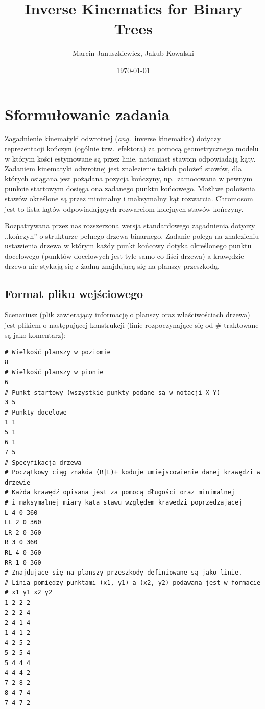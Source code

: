 \documentclass[11pt, leqno]{article}
\title{Inverse Kinematics for Binary Trees}
\date{\today}
\author{Marcin Januszkiewicz, Jakub Kowalski}
\begin{document}
\maketitle
\vspace{17em}
\tableofcontents
\newpage

\section{Sformułowanie zadania}
Zagadnienie kinematyki odwrotnej (\textit{ang.}\ inverse kinematics) dotyczy reprezentacji kończyn (ogólnie tzw.\ efektora) za pomocą geometrycznego modelu w którym kości estymowane są przez linie, natomiast stawom odpowiadają kąty. Zadaniem kinematyki odwrotnej jest znalezienie takich położeń stawów, dla których osiągana jest pożądana pozycja kończyny, np.\ zamocowana w pewnym punkcie startowym dosięga ona zadanego punktu końcowego. Możliwe położenia stawów określone są przez minimalny i maksymalny kąt rozwarcia. Chromosom jest to lista kątów odpowiadających rozwarciom kolejnych stawów kończyny.

Rozpatrywana przez nas rozszerzona wersja standardowego zagadnienia dotyczy ,,kończyn'' o strukturze pełnego drzewa binarnego. Zadanie polega na znalezieniu ustawienia drzewa w którym każdy punkt końcowy dotyka określonego punktu docelowego (punktów docelowych jest tyle samo co liści drzewa) a krawędzie drzewa nie stykają się z żadną znajdującą się na planszy przeszkodą.


\subsection{Format pliku wejściowego}
Scenariusz (plik zawierający informację o planszy oraz właściwościach drzewa) jest plikiem o następującej konstrukcji (linie rozpoczynające się od \# traktowane są jako komentarz):
\begin{verbatim}
# Wielkość planszy w poziomie
8
# Wielkość planszy w pionie
6
# Punkt startowy (wszystkie punkty podane są w notacji X Y)
3 5
# Punkty docelowe
1 1
5 1
6 1
7 5
# Specyfikacja drzewa
# Początkowy ciąg znaków (R|L)+ koduje umiejscowienie danej krawędzi w drzewie
# Każda krawędź opisana jest za pomocą długości oraz minimalnej
# i maksymalnej miary kąta stawu względem krawędzi poprzedzającej
L 4 0 360
LL 2 0 360
LR 2 0 360
R 3 0 360
RL 4 0 360
RR 1 0 360
# Znajdujące się na planszy przeszkody definiowane są jako linie.
# Linia pomiędzy punktami (x1, y1) a (x2, y2) podawana jest w formacie 
# x1 y1 x2 y2
1 2 2 2
2 2 2 4
2 4 1 4
1 4 1 2
4 2 5 2
5 2 5 4
5 4 4 4
4 4 4 2
7 2 8 2
8 4 7 4
7 4 7 2
\end{verbatim}
\end{document}
